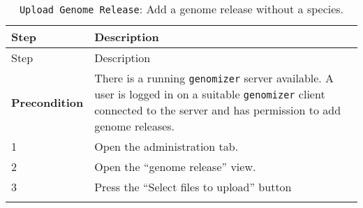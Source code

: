 \begin{longtable}[c]{@{}ll@{}}
\caption{\texttt{Upload\ Genome\ Release}: Add a genome release without
a species.}\tabularnewline
\toprule
\begin{minipage}[b]{0.31\columnwidth}\raggedright\strut
Step
\strut\end{minipage} &
\begin{minipage}[b]{0.63\columnwidth}\raggedright\strut
Description
\strut\end{minipage}\tabularnewline
\midrule
\endfirsthead
\toprule
\begin{minipage}[b]{0.31\columnwidth}\raggedright\strut
Step
\strut\end{minipage} &
\begin{minipage}[b]{0.63\columnwidth}\raggedright\strut
Description
\strut\end{minipage}\tabularnewline
\midrule
\endhead
\begin{minipage}[t]{0.31\columnwidth}\raggedright\strut
\textbf{Precondition}
\strut\end{minipage} &
\begin{minipage}[t]{0.63\columnwidth}\raggedright\strut
There is a running \texttt{genomizer} server available. A user is logged
in on a suitable \texttt{genomizer} client connected to the server and
has permission to add genome releases.
\strut\end{minipage}\tabularnewline
\begin{minipage}[t]{0.31\columnwidth}\raggedright\strut
1
\strut\end{minipage} &
\begin{minipage}[t]{0.63\columnwidth}\raggedright\strut
Open the administration tab.
\strut\end{minipage}\tabularnewline
\begin{minipage}[t]{0.31\columnwidth}\raggedright\strut
2
\strut\end{minipage} &
\begin{minipage}[t]{0.63\columnwidth}\raggedright\strut
Open the ``genome release'' view.
\strut\end{minipage}\tabularnewline
\begin{minipage}[t]{0.31\columnwidth}\raggedright\strut
3
\strut\end{minipage} &
\begin{minipage}[t]{0.63\columnwidth}\raggedright\strut
Press the ``Select files to upload'' button
\strut\end{minipage}\tabularnewline
\begin{minipage}[t]{0.31\columnwidth}\raggedright\strut

\end{minipage}
\end{longtable}
